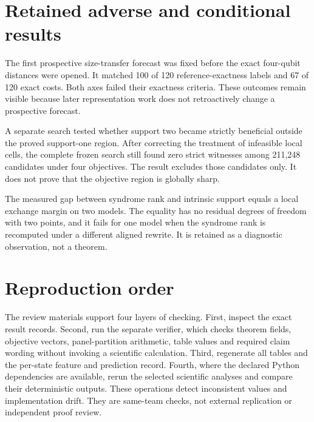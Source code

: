 \documentclass[a4paper,onecolumn,11pt,unpublished,noarxiv]{quantumarticle}
\begin{document}
\section{Retained adverse and conditional results}

The first prospective size-transfer forecast was fixed before the exact four-qubit distances were opened.  It matched 100 of 120 reference-exactness labels and 67 of 120 exact costs.  Both axes failed their exactness criteria.  These outcomes remain visible because later representation work does not retroactively change a prospective forecast.

A separate search tested whether support two became strictly beneficial outside the proved support-one region.  After correcting the treatment of infeasible local cells, the complete frozen search still found zero strict witnesses among 211,248 candidates under four objectives.  The result excludes those candidates only.  It does not prove that the objective region is globally sharp.

The measured gap between syndrome rank and intrinsic support equals a local exchange margin on two models.  The equality has no residual degrees of freedom with two points, and it fails for one model when the syndrome rank is recomputed under a different aligned rewrite.  It is retained as a diagnostic observation, not a theorem.

\AdverseResultsTable
\FloatBarrier

\section{Reproduction order}

The review materials support four layers of checking.  First, inspect the exact result records.  Second, run the separate verifier, which checks theorem fields, objective vectors, panel-partition arithmetic, table values and required claim wording without invoking a scientific calculation.  Third, regenerate all tables and the per-state feature and prediction record.  Fourth, where the declared Python dependencies are available, rerun the selected scientific analyses and compare their deterministic outputs.  These operations detect inconsistent values and implementation drift.  They are same-team checks, not external replication or independent proof review.



\end{document}
